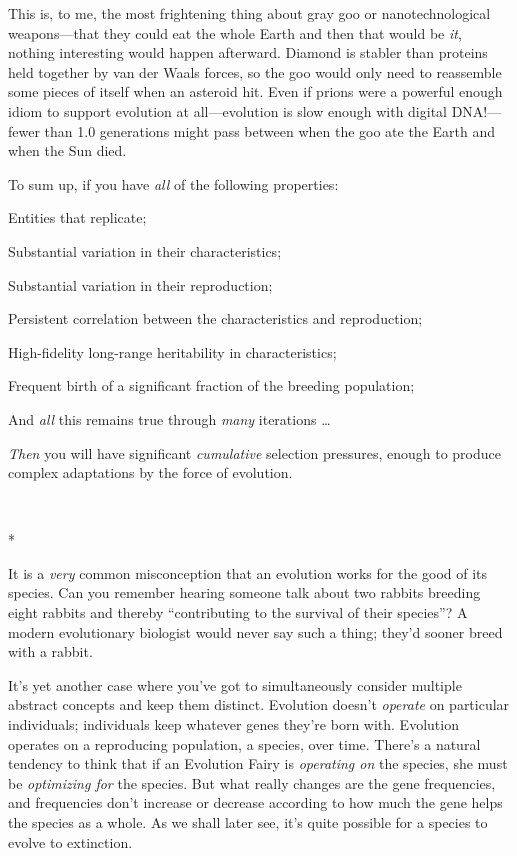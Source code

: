 {
 This is, to me, the most frightening thing about gray goo or
nanotechnological weapons---that they could eat the whole Earth and
then that would be \textit{it}, nothing interesting would happen
afterward. Diamond is stabler than proteins held together by van der
Waals forces, so the goo would only need to reassemble some pieces of
itself when an asteroid hit. Even if prions were a powerful enough
idiom to support evolution at all---evolution is slow enough with
digital DNA!---fewer than 1.0 generations might pass between when the
goo ate the Earth and when the Sun died.}

{
 To sum up, if you have \textit{all} of the following properties:}

{
 Entities that replicate;}

{
 Substantial variation in their characteristics;}

{
 Substantial variation in their reproduction;}

{
 Persistent correlation between the characteristics and
reproduction;}

{
 High-fidelity long-range heritability in characteristics;}

{
 Frequent birth of a significant fraction of the breeding
population;}

{
 And \textit{all} this remains true through \textit{many}
iterations \ldots}

{
 \textit{Then} you will have significant \textit{cumulative}
selection pressures, enough to produce complex adaptations by the force
of evolution.}

{\centering
 \ ~
\par}

{\centering
 *
\par}


{
 It is a \textit{very} common misconception that an evolution works
for the good of its species. Can you remember hearing someone talk
about two rabbits breeding eight rabbits and thereby
``contributing to the survival of their
species''? A modern evolutionary biologist would
never say such a thing; they'd sooner breed with a
rabbit. }

{
 It's yet another case where you've
got to simultaneously consider multiple abstract concepts and keep them
distinct. Evolution doesn't \textit{operate} on
particular individuals; individuals keep whatever genes
they're born with. Evolution operates on a reproducing
population, a species, over time. There's a natural
tendency to think that if an Evolution Fairy is \textit{operating on}
the species, she must be \textit{optimizing for} the species. But what
really changes are the gene frequencies, and frequencies
don't increase or decrease according to how much the
gene helps the species as a whole. As we shall later see,
it's quite possible for a species to evolve to
extinction.}

